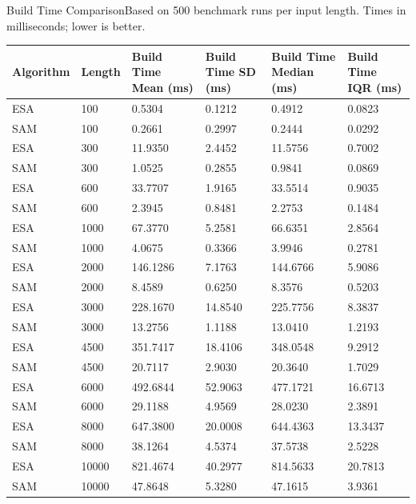 \begin{benchmarktable}{Build Time Comparison}{Based on 500 benchmark runs per input length. Times in milliseconds; lower is better.}
\begin{tabularx}{\textwidth}{|X|X|X|X|X|X|}
\toprule
Algorithm & Length & Build Time Mean (ms) & Build Time SD (ms) & Build Time Median (ms) & Build Time IQR (ms) \\
\midrule
ESA & 100 & 0.5304 & 0.1212 & 0.4912 & 0.0823 \\
SAM & 100 & 0.2661 & 0.2997 & 0.2444 & 0.0292 \\
\hline
ESA & 300 & 11.9350 & 2.4452 & 11.5756 & 0.7002 \\
SAM & 300 & 1.0525 & 0.2855 & 0.9841 & 0.0869 \\
\hline
ESA & 600 & 33.7707 & 1.9165 & 33.5514 & 0.9035 \\
SAM & 600 & 2.3945 & 0.8481 & 2.2753 & 0.1484 \\
\hline
ESA & 1000 & 67.3770 & 5.2581 & 66.6351 & 2.8564 \\
SAM & 1000 & 4.0675 & 0.3366 & 3.9946 & 0.2781 \\
\hline
ESA & 2000 & 146.1286 & 7.1763 & 144.6766 & 5.9086 \\
SAM & 2000 & 8.4589 & 0.6250 & 8.3576 & 0.5203 \\
\hline
ESA & 3000 & 228.1670 & 14.8540 & 225.7756 & 8.3837 \\
SAM & 3000 & 13.2756 & 1.1188 & 13.0410 & 1.2193 \\
\hline
ESA & 4500 & 351.7417 & 18.4106 & 348.0548 & 9.2912 \\
SAM & 4500 & 20.7117 & 2.9030 & 20.3640 & 1.7029 \\
\hline
ESA & 6000 & 492.6844 & 52.9063 & 477.1721 & 16.6713 \\
SAM & 6000 & 29.1188 & 4.9569 & 28.0230 & 2.3891 \\
\hline
ESA & 8000 & 647.3800 & 20.0008 & 644.4363 & 13.3437 \\
SAM & 8000 & 38.1264 & 4.5374 & 37.5738 & 2.5228 \\
\hline
ESA & 10000 & 821.4674 & 40.2977 & 814.5633 & 20.7813 \\
SAM & 10000 & 47.8648 & 5.3280 & 47.1615 & 3.9361 \\
\bottomrule
\end{tabularx}
\end{benchmarktable}

